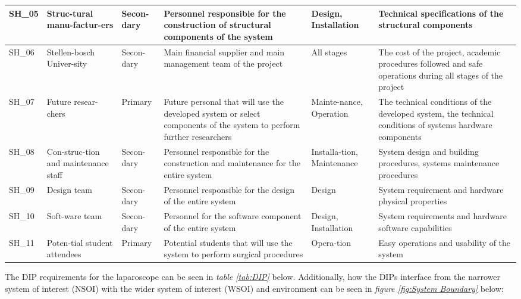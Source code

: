 \begin{longtable}{|p{}|p{}|p{}|p{}|p{}|p{}|}
SH\_05 & 
Struc-tural manu-factur-ers & 
Secon-dary & 
Personnel responsible for the construction of structural 
components of the system & 
Design, Installation & 
Technical specifications of the structural components \\
\hline

SH\_06 & 
Stellen-bosch Univer-sity & 
Secon-dary & 
Main financial supplier and main management team of 
the project & 
All stages & 
The cost of the project, academic procedures followed 
and safe operations during all stages of the project \\
\hline

SH\_07 & 
Future resear-chers & 
Primary & 
Future personal that will use the developed system or select 
components of the system to perform further researchers & 
Mainte-nance, Operation & 
The technical conditions of the developed system, the 
technical conditions of systems hardware components \\
\hline

SH\_08 & 
Con-struc-tion and maintenance staff & 
Secon-dary & 
Personnel responsible for the construction and maintenance 
for the entire system & 
Installa-tion, Maintenance & 
System design and building procedures, systems maintenance 
procedures \\
\hline

SH\_09 & 
Design team & 
Secon-dary & 
Personnel responsible for the design of the entire system & 
Design & 
System requirement and hardware physical properties \\
\hline

SH\_10 & 
Soft-ware team & 
Secon-dary & 
Personnel for the software component of the entire system & 
Design, Installation & 
System requirements and hardware software capabilities \\
\hline

SH\_11 & 
Poten-tial student attendees & 
Primary & 
Potential students that will use the system to perform 
surgical procedures & 
Opera-tion & 
Easy operations and usability of the system \\
\hline

\end{longtable}


The DIP requirements for the laparoscope can be seen in \textit{table \ref{tab:DIP}} below. Additionally, how the DIPs interface from the narrower system of interest (NSOI) with the wider system of interest (WSOI) and environment can be seen in \textit{figure \ref{fig:System Boundary}} below:

